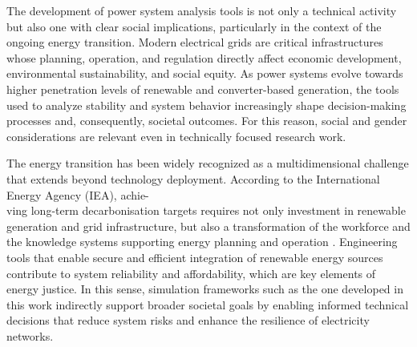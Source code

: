 




The development of power system analysis tools is not only a technical activity but also one with clear social implications,
particularly in the context of the ongoing energy transition. Modern electrical grids are critical infrastructures whose 
planning, operation, and regulation directly affect economic development, environmental sustainability, and social equity. 
As power systems evolve towards higher penetration levels of renewable and converter-based generation, the tools used to 
analyze stability and system behavior increasingly shape decision-making processes and, consequently, societal outcomes. 
For this reason, social and gender considerations are relevant even in technically focused research work.

The energy transition has been widely recognized as a multidimensional challenge that extends beyond technology deployment. 
According to the International Energy Agency (IEA), achie-\\ving long-term decarbonisation targets requires not only investment 
in renewable generation and grid infrastructure, but also a transformation of the workforce and the knowledge systems supporting 
energy planning and operation \cite{IEA2024Gender}. Engineering tools that enable secure and efficient integration of renewable 
energy sources contribute to system reliability and affordability, which are key elements of energy justice. 
In this sense, simulation frameworks such as the one developed in this work indirectly support broader societal goals 
by enabling informed technical decisions that reduce system risks and enhance the resilience of electricity networks.

